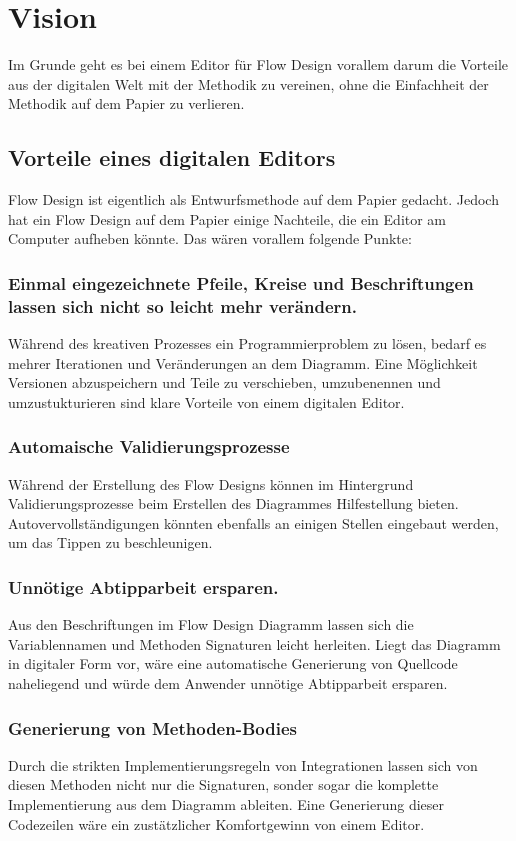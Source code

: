 \documentclass[11pt]{article}
\date{\today}
\title{}
\begin{document}
\tableofcontents

\section{Vision}
\label{sec:orgheadline8}
Im Grunde geht es bei einem Editor für Flow Design vorallem darum die Vorteile aus der digitalen Welt mit
der Methodik zu vereinen, ohne die Einfachheit der Methodik auf dem Papier zu
verlieren. 

\subsection{Vorteile eines digitalen Editors}
\label{sec:orgheadline6}
Flow Design ist eigentlich als Entwurfsmethode auf dem Papier gedacht.
Jedoch hat ein Flow Design auf dem Papier einige Nachteile, die ein Editor am
Computer aufheben könnte. Das wären vorallem folgende Punkte:
\subsubsection{Einmal eingezeichnete Pfeile, Kreise und Beschriftungen lassen sich nicht so leicht mehr verändern.}
\label{sec:orgheadline1}
Während des kreativen Prozesses ein Programmierproblem zu lösen, bedarf es
mehrer Iterationen und Veränderungen an dem Diagramm. Eine Möglichkeit Versionen
abzuspeichern und Teile zu verschieben, umzubenennen und umzustukturieren sind
klare Vorteile von einem digitalen Editor.
\subsubsection{Automaische Validierungsprozesse}
\label{sec:orgheadline2}
Während der Erstellung des Flow Designs können im Hintergrund
Validierungsprozesse beim Erstellen des Diagrammes Hilfestellung bieten.
Autovervollständigungen könnten ebenfalls an einigen Stellen eingebaut werden,
um das Tippen zu beschleunigen.
\subsubsection{Unnötige Abtipparbeit ersparen.}
\label{sec:orgheadline3}
Aus den Beschriftungen im Flow Design Diagramm lassen sich die Variablennamen und
Methoden Signaturen leicht herleiten. Liegt das Diagramm in digitaler Form vor,
wäre eine automatische Generierung von Quellcode naheliegend und
würde dem Anwender unnötige Abtipparbeit ersparen.
\subsubsection{Generierung von Methoden-Bodies}
\label{sec:orgheadline4}
Durch die strikten Implementierungsregeln von Integrationen lassen sich von
diesen Methoden nicht nur die Signaturen, sonder sogar die komplette Implementierung aus dem Diagramm
ableiten. Eine Generierung dieser Codezeilen wäre ein zustätzlicher Komfortgewinn von einem Editor.
\end{document}

